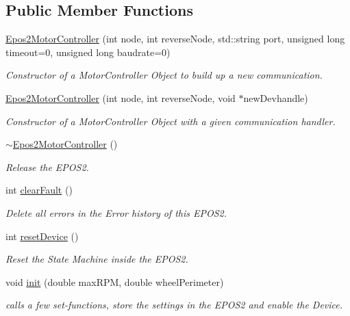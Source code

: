 \subsection*{Public Member Functions}
\begin{DoxyCompactItemize}
\item 
\hyperlink{classEpos2MotorController_a17d3eddbf93f2fa7622ab734a6c8e615}{Epos2\-Motor\-Controller} (int node, int reverse\-Node, std\-::string port, unsigned long timeout=0, unsigned long baudrate=0)
\begin{DoxyCompactList}\small\item\em Constructor of a Motor\-Controller Object to build up a new communication. \end{DoxyCompactList}\item 
\hyperlink{classEpos2MotorController_a85702068308f7694af8caf78a599ba31}{Epos2\-Motor\-Controller} (int node, int reverse\-Node, void $\ast$new\-Devhandle)
\begin{DoxyCompactList}\small\item\em Constructor of a Motor\-Controller Object with a given communication handler. \end{DoxyCompactList}\item 
\hyperlink{classEpos2MotorController_a897a1929a53a5c5211e925eab8792c90}{$\sim$\-Epos2\-Motor\-Controller} ()
\begin{DoxyCompactList}\small\item\em Release the E\-P\-O\-S2. \end{DoxyCompactList}\item 
int \hyperlink{classEpos2MotorController_a07446045b12515427feda98fea36dab2}{clear\-Fault} ()
\begin{DoxyCompactList}\small\item\em Delete all errors in the Error history of this E\-P\-O\-S2. \end{DoxyCompactList}\item 
int \hyperlink{classEpos2MotorController_a257e06f445d5ecc34f1dbae30e63fc9f}{reset\-Device} ()
\begin{DoxyCompactList}\small\item\em Reset the State Machine inside the E\-P\-O\-S2. \end{DoxyCompactList}\item 
void \hyperlink{classEpos2MotorController_a0c2778ab028417b907d7a55297ccbd4a}{init} (double max\-R\-P\-M, double wheel\-Perimeter)
\begin{DoxyCompactList}\small\item\em calls a few set-\/functions, store the settings in the E\-P\-O\-S2 and enable the Device. \end{DoxyCompactList}\item 

\end{DoxyCompactItemize}
